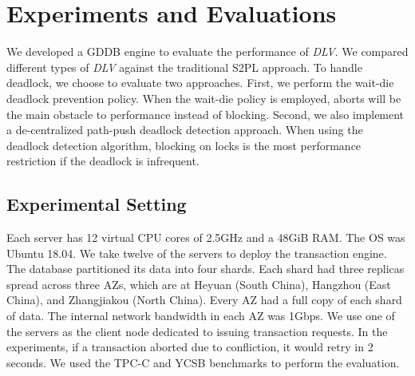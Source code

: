 \documentclass[conference]{IEEEtran}
\begin{document}

\section{Experiments and Evaluations}
\label{sec:experiment}
We developed a GDDB engine to evaluate the performance of \emph{DLV}.
We compared different types of \emph{DLV} against the traditional S2PL approach.
To handle deadlock, we choose to evaluate two approaches.
First,  we perform the wait-die deadlock prevention policy.
When the wait-die policy is employed, aborts will be the main obstacle to performance instead of blocking.
Second, we also implement a de-centralized path-push deadlock detection approach.
When using the deadlock detection algorithm,  blocking on locks is the most performance restriction if the deadlock is infrequent.

\subsection{Experimental Setting}
\label{subsec:exp_setting}
Each server has 12 virtual CPU cores of 2.5GHz and a 48GiB RAM.
The OS was Ubuntu 18.04.
We take twelve of the servers to deploy the transaction engine.
The database partitioned its data into four shards.
Each shard had three replicas spread across three AZs,
which are at Heyuan (South China), Hangzhou (East China), and Zhangjiakou (North China).
Every AZ had a full copy of each shard of data.
The internal network bandwidth in each AZ was 1Gbps.
We use one of the servers as the client node dedicated to issuing transaction requests.
In the experiments, if a transaction aborted due to confliction, it would retry in 2 seconds.
We used the TPC-C and YCSB benchmarks to perform the evaluation.
\end{document}
